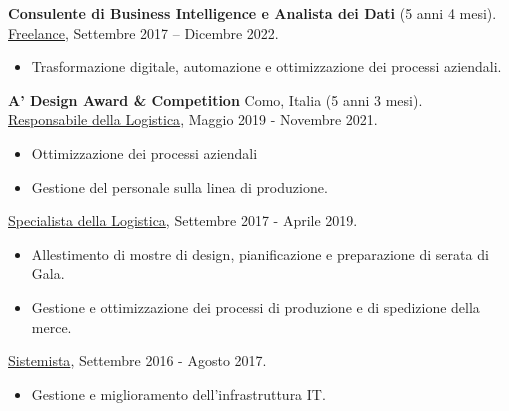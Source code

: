 \documentclass[a4paper,10pt,fullpage]{article}
\begin{document}
\textbf{Consulente di Business Intelligence e Analista dei Dati} (5 anni 4 mesi).\\
\underline{Freelance}, Settembre 2017 – Dicembre 2022.
\begin{itemize}
	\item[--] Trasformazione digitale, automazione e ottimizzazione dei processi aziendali.\\
\end{itemize}

\textbf{A' Design Award \& Competition} Como, Italia (5 anni 3 mesi).\\
\underline{Responsabile della Logistica}, Maggio 2019 - Novembre 2021.
\begin{itemize}
	\item[--] Ottimizzazione dei processi aziendali 
	\item[--] Gestione del personale sulla linea di produzione.
\end{itemize}
\underline{Specialista della Logistica}, Settembre 2017 - Aprile 2019.
\begin{itemize}
	\item[--] Allestimento di mostre di design, pianificazione e preparazione di serata di Gala.
	\item[--] Gestione e ottimizzazione dei processi di produzione e di spedizione della merce.
\end{itemize}
\underline{Sistemista}, Settembre 2016 - Agosto 2017.
\begin{itemize}
	\item[--] Gestione e miglioramento dell'infrastruttura IT.\\
\end{itemize}
\end{document}

